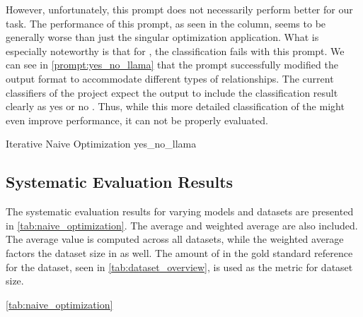 However, unfortunately, this prompt does not necessarily perform better for our task.
The performance of this prompt, as seen in the  column, seems to be generally worse than just the singular optimization application.
What is especially noteworthy is that for \llama, the classification fails with this prompt.
We can see in \autoref{prompt:yes_no_llama} that the prompt successfully modified the output format to accommodate different types of relationships.
The current classifiers of the \LiSSA project expect the \LLM output to include the classification result clearly as \textquotesingle yes \textquotesingle or \textquotesingle no \textquotesingle.
Thus, while this more detailed classification of the \LLM might even improve performance, it can not be properly evaluated.

\begin{prompt}{\KISS Iterative Naive Optimization \llama}{yes_no_llama}
    \\
    
\end{prompt}

\subsection{Systematic Evaluation Results}
\label{subsec:Evaluation:naive_optimization:systematic-evaluation-results}

The systematic evaluation results for varying models and datasets are presented in \autoref{tab:naive_optimization}.
The average and weighted average are also included.
The average value is computed across all datasets, while the weighted average factors the dataset size in as well.
The amount of \TLs in the gold standard reference for the dataset, seen in \autoref{tab:dataset_overview}, is used as the metric for dataset size.

\autoref{tab:naive_optimization} 

\begin{table}
    \centering
    \renewcommand{\arraystretch}{1.4}
    
    \renewcommand{\arraystretch}{1}
    \caption{Naive prompt optimization approach prompting the model to optimize the classification prompt.}
    \label{tab:naive_optimization}
\end{table}

